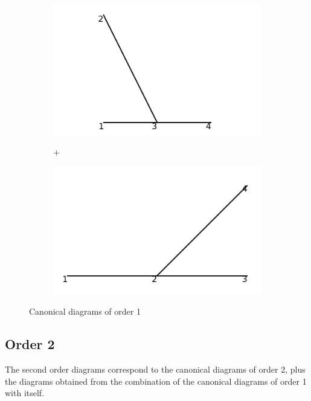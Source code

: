 \documentclass[11pt,a4paper,twoside,pdf]{article}
\numberwithin{equation}{section}
\begin{document}
\begin{figure}[h!]
    \centering
    \begin{subfigure}[t]{0.33\textwidth}
        \centering
        \includegraphics[width=\textwidth]{plots/canonical/order1/1.png}
        \caption{ }
        \label{fig:cannonical1_1}
    \end{subfigure}%
    \begin{subfigure}[t]{0.1\textwidth}
        \centering
        {\LARGE $+$}
    \end{subfigure}
    \begin{subfigure}[t]{0.33\textwidth}
        \centering
        \includegraphics[width=\textwidth]{plots/canonical/order1/2.png}
        \caption{ }
        \label{fig:cannonical1_2}
    \end{subfigure}
    \caption{Canonical diagrams of order 1}
    \label{fig:cannonical1_}
\end{figure}

\subsection{Order 2}
The second order diagrams correspond to the canonical diagrams of order 2,
plus the diagrams obtained from the combination of the canonical diagrams of order 1 with 
itself.
\end{document}
